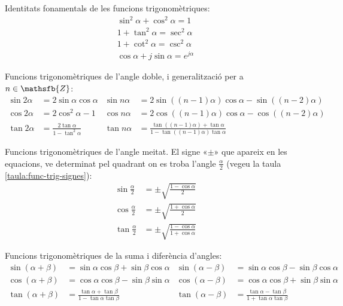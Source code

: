 Identitats fonamentals de les funcions trigonomètriques:
\begin{gather}
    \sin^2\alpha + \cos^2\alpha = 1 \\
    1 + \tan^2\alpha = \sec^2\alpha\\
    1 + \cot^2\alpha = \csc^2\alpha\\
    \cos\alpha + j \sin\alpha = e^{j\alpha}
\end{gather}

Funcions trigonomètriques de l'angle doble, i generalització per a
$n\in\mathsfb{Z}$:
\begin{subequations}
\begin{align}
    \sin 2\alpha &= 2 \sin\alpha \cos\alpha & \sin n \alpha &=
    2\sin ((n-1)\alpha) \cos \alpha -\sin((n-2)\alpha) \\[1ex]
    \cos 2\alpha &= 2 \cos^2\alpha -1 & \cos n\alpha &=
    2\cos((n-1)\alpha) \cos \alpha -\cos((n-2)\alpha) \\[1ex]
    \tan 2\alpha &=\frac{2\tan\alpha}{1-\tan^2\alpha} & \tan n
    \alpha &= \frac{\tan((n-1)\alpha) + \tan\alpha}{1-\tan((n-1)\alpha) \tan\alpha}
\end{align}
\end{subequations}


Funcions trigonomètriques de l'angle meitat. El signe «$\pm$» que
apareix en les equacions, ve determinat pel quadrant on es troba
l'angle $\frac{\alpha}{2}$ (vegeu la taula
\vref{taula:func-trig-signes}):
\begin{subequations}
\begin{align}
    \sin \frac{\alpha}{2} &= \pm \sqrt{\frac{1-\cos\alpha}{2}}\\[1ex]
    \cos \frac{\alpha}{2} &= \pm \sqrt{\frac{1+\cos\alpha}{2}}\\[1ex]
    \tan \frac{\alpha}{2} &= \pm \sqrt{\frac{1-\cos\alpha}{1+\cos\alpha}}
\end{align}
\end{subequations}


Funcions trigonomètriques de la suma i diferència d'angles:
\begin{subequations}
\begin{align}
    \sin(\alpha+\beta) &= \sin\alpha \cos\beta + \sin\beta\cos\alpha &
    \sin(\alpha-\beta) &= \sin\alpha \cos\beta - \sin\beta\cos\alpha\\[1ex]
    \cos(\alpha+\beta) &= \cos\alpha \cos\beta - \sin\beta\sin\alpha &
    \cos(\alpha-\beta) &= \cos\alpha \cos\beta + \sin\beta\sin\alpha\label{eq:cos-a-b}\\[1ex]
    \tan(\alpha+\beta) &=\frac{\tan\alpha+\tan\beta}{1-\tan\alpha\tan\beta} &
    \tan(\alpha-\beta)
    &=\frac{\tan\alpha-\tan\beta}{1+\tan\alpha\tan\beta}
\end{align}
\end{subequations}


